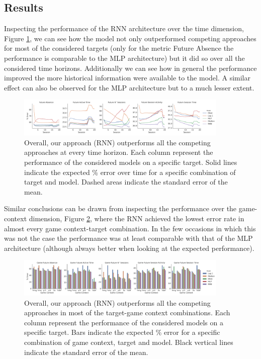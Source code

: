 \subsection{Results}
\label{results_2}
Inspecting the performance of the RNN architecture over the time dimension, Figure \ref{model_comp_coll_game_32}, we can see how the model not only outperformed competing approaches for most of the considered targets (only for the metric Future Absence the performance is comparable to the MLP architecture) but it did so over all the considered time horizons. Additionally we can see how in general the performance improved the more historical information were available to the model. A similar effect can also be observed for the MLP architecture but to a much lesser extent.
\begin{figure}[h]
\centering
\includegraphics[width=0.9\textwidth]{images/chapter_3/models_comparison_collapsed_game_32.png}
\caption[\textbf{Model comparison collapsing over game context}]{ Overall, our approach (RNN) outperforms all the competing approaches at every time horizon. Each column represent the performance of the considered models on a specific target. Solid lines indicate the expected \% error over time for a specific combination of target and model. Dashed areas indicate the standard error of the mean.}
\label{model_comp_coll_game_32}
\end{figure}
Similar conclusions can be drawn from inspecting the performance over the game-context dimension, Figure \ref{model_comp_coll_time_32}, where the RNN achieved the lowest error rate in almost every game context-target combination. In the few occasions in which this was not the case the performance was at least comparable with that of the MLP architecture (although always better when looking at the expected performance).
\begin{figure}[h]
\centering
\includegraphics[width=0.9\textwidth]{images/chapter_3/models_comparison_collapsed_time_32.png}
\caption[\textbf{Model comparison collapsing over time}]{ Overall, our approach (RNN) outperforms all the competing approaches in most of the target-game context combinations. Each column represent the performance of the considered models on a specific target. Bars indicate the expected \% error for a specific combination of game context, target and model. Black vertical lines indicate the standard error of the mean.}
\label{model_comp_coll_time_32} 
\end{figure}
